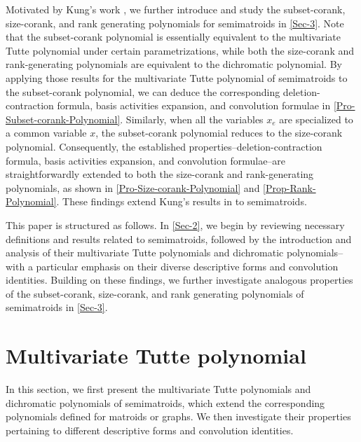 \documentclass[12pt]{article}%
\numberwithin{equation}{section}
\begin{document}
Motivated by Kung's work \cite{Kung2010}, we further introduce and study the subset-corank, size-corank, and rank generating polynomials for semimatroids in \autoref{Sec-3}. Note that the subset-corank polynomial is essentially equivalent to the multivariate Tutte polynomial under certain parametrizations, while both the size-corank and rank-generating polynomials are equivalent to the dichromatic polynomial. By applying those results for the multivariate Tutte polynomial of semimatroids to the subset-corank polynomial, we can deduce the corresponding deletion-contraction formula, basis activities expansion, and convolution formulae in \autoref{Pro-Subset-corank-Polynomial}. Similarly, when all the variables $x_e$ are specialized to a common variable $x$, the subset-corank polynomial reduces to the size-corank polynomial. Consequently, the established properties--deletion-contraction formula, basis activities expansion, and convolution formulae--are straightforwardly extended to both the size-corank and rank-generating polynomials, as shown in \autoref{Pro-Size-corank-Polynomial} and \autoref{Prop-Rank-Polynomial}. These findings extend Kung's results in \cite{Kung2010} to semimatroids.

This paper is structured as follows. In \autoref{Sec-2}, we begin by reviewing necessary definitions and results related to semimatroids, followed by the introduction and analysis of their multivariate Tutte polynomials and dichromatic polynomials--with a particular emphasis on their diverse descriptive forms and convolution identities. Building on these findings, we further investigate analogous properties of the subset-corank, size-corank, and rank generating polynomials of semimatroids in \autoref{Sec-3}.
\section{Multivariate Tutte polynomial}\label{Sec-2}
In this section, we first present the multivariate Tutte polynomials and dichromatic polynomials of semimatroids, which extend the corresponding polynomials defined for matroids or graphs. We then investigate their properties pertaining to different descriptive forms and convolution identities.
\end{document}
